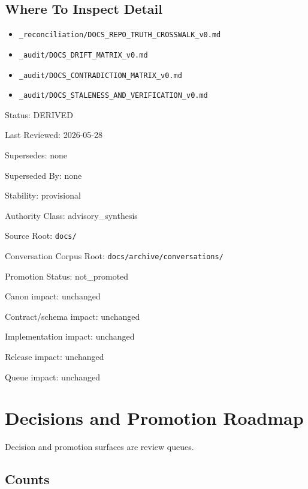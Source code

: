 \documentclass[10.5pt,a4paper]{book}
\begin{document}
\chapter{Where To Inspect Detail}

\begin{itemize}
\item \texttt{\_\allowbreak{}reconciliation/\allowbreak{}DOCS\_\allowbreak{}REPO\_\allowbreak{}TRUTH\_\allowbreak{}CROSSWALK\_\allowbreak{}v0.\allowbreak{}md}
\item \texttt{\_\allowbreak{}audit/\allowbreak{}DOCS\_\allowbreak{}DRIFT\_\allowbreak{}MATRIX\_\allowbreak{}v0.\allowbreak{}md}
\item \texttt{\_\allowbreak{}audit/\allowbreak{}DOCS\_\allowbreak{}CONTRADICTION\_\allowbreak{}MATRIX\_\allowbreak{}v0.\allowbreak{}md}
\item \texttt{\_\allowbreak{}audit/\allowbreak{}DOCS\_\allowbreak{}STALENESS\_\allowbreak{}AND\_\allowbreak{}VERIFICATION\_\allowbreak{}v0.\allowbreak{}md}
\end{itemize}


Status: DERIVED

Last Reviewed: 2026-\allowbreak{}05-\allowbreak{}28

Supersedes: none

Superseded By: none

Stability: provisional

Authority Class: advisory\_\allowbreak{}synthesis

Source Root: \texttt{docs/\allowbreak{}}

Conversation Corpus Root: \texttt{docs/\allowbreak{}archive/\allowbreak{}conversations/\allowbreak{}}

Promotion Status: not\_\allowbreak{}promoted

Canon impact: unchanged

Contract/\allowbreak{}schema impact: unchanged

Implementation impact: unchanged

Release impact: unchanged

Queue impact: unchanged


\part{Decisions and Promotion Roadmap}

Decision and promotion surfaces are review queues.\allowbreak{}


\chapter{Counts}
\end{document}
